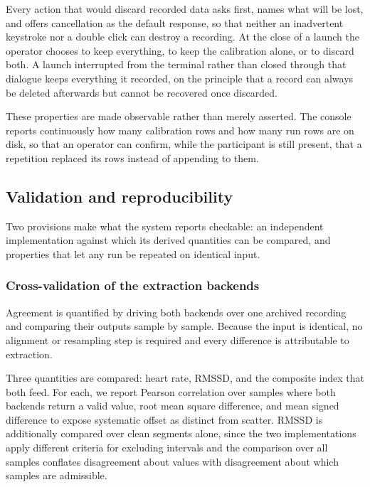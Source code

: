 Every action that would discard recorded data asks first, names
what will be lost, and offers cancellation as the default
response, so that neither an inadvertent keystroke nor a double
click can destroy a recording. At the close of a launch the
operator chooses to keep everything, to keep the calibration
alone, or to discard both. A launch interrupted from the terminal
rather than closed through that dialogue keeps everything it
recorded, on the principle that a record can always be deleted
afterwards but cannot be recovered once discarded.

These properties are made observable rather than merely asserted.
The console reports continuously how many calibration rows and how
many run rows are on disk, so that an operator can confirm, while
the participant is still present, that a repetition replaced its
rows instead of appending to them.

\subsection{Validation and reproducibility}
\label{sec:reproducibility}

Two provisions make what the system reports checkable: an
independent implementation against which its derived quantities
can be compared, and properties that let any run be repeated on
identical input.

\subsubsection{Cross-validation of the extraction backends}
\label{sec:crossval}

Agreement is quantified by driving both backends over one
archived recording and comparing their outputs sample by sample.
Because the input is identical, no alignment or resampling step
is required and every difference is attributable to extraction.

Three quantities are compared: heart rate, RMSSD, and the
composite index that both feed. For each, we report Pearson
correlation over samples where both backends return a valid
value, root mean square difference, and mean signed difference to
expose systematic offset as distinct from scatter. RMSSD is
additionally compared over clean segments alone, since the two
implementations apply different criteria for excluding intervals
and the comparison over all samples conflates disagreement about
values with disagreement about which samples are admissible.

